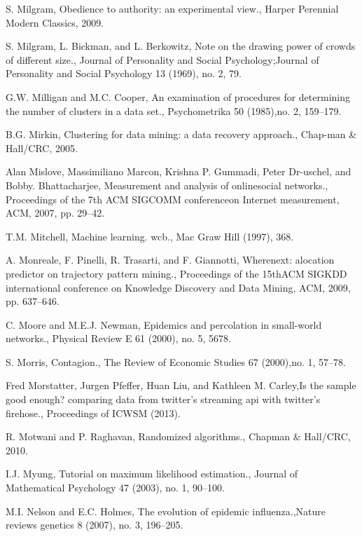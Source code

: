 \begin{thebibliography}{999}
 S. Milgram, Obedience to authority: an experimental view., Harper Perennial Modern Classics, 2009.

 S. Milgram, L. Bickman, and L. Berkowitz, Note on the drawing power of crowds of different size., Journal of Personality and Social Psychology;Journal of Personality and Social Psychology 13 (1969), no. 2, 79.

 G.W. Milligan and M.C. Cooper, An examination of procedures for determining the number of clusters in a data set., Psychometrika 50 (1985),no. 2, 159–179.

 B.G. Mirkin, Clustering for data mining: a data recovery approach., Chap-man \& Hall/CRC, 2005.

 Alan Mislove, Massimiliano Marcon, Krishna P. Gummadi, Peter Dr-uschel, and Bobby. Bhattacharjee, Measurement and analysis of onlinesocial networks., Proceedings of the 7th ACM SIGCOMM conferenceon Internet measurement, ACM, 2007, pp. 29–42.

 T.M. Mitchell, Machine learning. wcb., Mac Graw Hill (1997), 368.

 A. Monreale, F. Pinelli, R. Trasarti, and F. Giannotti, Wherenext: alocation predictor on trajectory pattern mining., Proceedings of the 15thACM SIGKDD international conference on Knowledge Discovery and Data Mining, ACM, 2009, pp. 637–646.

 C. Moore and M.E.J. Newman, Epidemics and percolation in small-world networks., Physical Review E 61 (2000), no. 5, 5678.

 S. Morris, Contagion., The Review of Economic Studies 67 (2000),no. 1, 57–78.

 Fred Morstatter, Jurgen Pfeffer, Huan Liu, and Kathleen M. Carley,Is the sample good enough? comparing data from twitter’s streaming api with twitter’s firehose., Proceedings of ICWSM (2013).

 R. Motwani and P. Raghavan, Randomized algorithms., Chapman \& Hall/CRC, 2010.

 I.J. Myung, Tutorial on maximum likelihood estimation., Journal of Mathematical Psychology 47 (2003), no. 1, 90–100.

 M.I. Nelson and E.C. Holmes, The evolution of epidemic influenza.,Nature reviews genetics 8 (2007), no. 3, 196–205.


\end{thebibliography}
